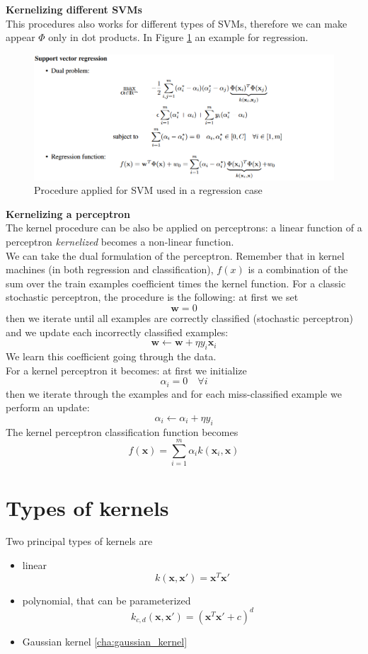\textbf{Kernelizing different SVMs}\\
This procedures also works for different types of SVMs, therefore we can make appear $\Phi$ only in dot products. In Figure \ref{fig:SVM_regression_kernel} an example for regression.\\
\begin{figure}[ht]
    \centering
    \includegraphics[scale=0.5]{images/kernel_SVM_regression.png}
    \caption{Procedure applied for SVM used in a regression case}
    \label{fig:SVM_regression_kernel}
\end{figure}

\textbf{Kernelizing a perceptron}\\
The kernel procedure can be also be applied on perceptrons: a linear function of a perceptron \textit{kernelized} becomes a non-linear function.\\
We can take the dual formulation of the perceptron. Remember that in kernel machines (in both regression and classification), $f(x)$ is a combination of the sum over the train examples coefficient times the kernel function.
For a classic stochastic perceptron, the procedure is the following: at first we set 
$$\pmb{w} = 0$$
then we iterate until all examples are correctly classified (stochastic perceptron) and we update each incorrectly classified examples: 
$$\pmb{w} \leftarrow \pmb{w} + \eta y_i \pmb{x}_i$$
We learn this coefficient going through the data. \\

For a kernel perceptron it becomes: 
at first we initialize
$$\alpha_i = 0 \quad \forall i$$
then we iterate through the examples and for each miss-classified example we perform an update:
$$\alpha_i \leftarrow \alpha_i + \eta y_i$$
The kernel perceptron classification function becomes
$$f(\pmb{x}) = \sum _{i=1} ^m \alpha_i k(\pmb{x}_i, \pmb{x})$$

\section{Types of kernels}
    Two principal types of kernels are 
    \begin{itemize}
        \item linear $$k(\pmb{x}, \pmb{x}') = \pmb{x}^T \pmb{x}'$$
        \item polynomial, that can be parameterized 
        $$k_{c, d} (\pmb{x}, \pmb{x}') = (\pmb{x}^T \pmb{x}' + c) ^d$$
        \item Gaussian kernel \ref{cha:gaussian_kernel}
    \end{itemize}

